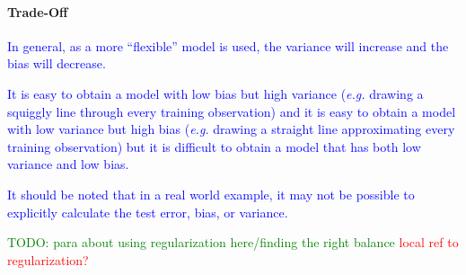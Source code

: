 \paragraph{Trade-Off}


\textcolor{blue}{In general, as a more ``flexible'' model is used, the variance will increase and the bias will decrease.}


\textcolor{blue}{It is easy to obtain a model with low bias but high variance (\emph{e.g.} drawing a squiggly line through every training observation) and it is easy to obtain a model with low variance but high bias (\emph{e.g.} drawing a straight line approximating every training observation) but it is difficult to obtain a model that has both low variance and low bias.}

\textcolor{blue}{It should be noted that in a real world example, it may not be possible to explicitly calculate the test error, bias, or variance.}

\textcolor{green}{TODO: para about using regularization here/finding the right balance \textcolor{red}{local ref to regularization?}}
